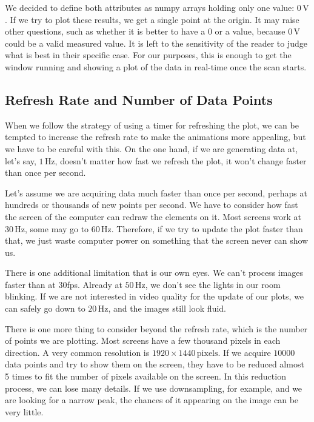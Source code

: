We decided to define both attributes as numpy arrays holding only one value: $0\,\textrm{V}$. If we try to plot these results, we get a single point at the origin. It may raise other questions, such as whether it is better to have a $0$ or a  value, because $0\,\textrm{V}$ could be a valid measured value. It is left to the sensitivity of the reader to judge what is best in their specific case. For our purposes, this is enough to get the window running and showing a plot of the data in real-time once the scan starts.


\subsection{Refresh Rate and Number of Data Points}\label{subsec:refresh-rate-and-number-of-data-points}
When we follow the strategy of using a timer for refreshing the plot, we can be tempted to increase the refresh rate to make the animations more appealing, but we have to be careful with this. On the one hand, if we are generating data at, let's say, $1\,\textrm{Hz}$, doesn't matter how fast we refresh the plot, it won't change faster than once per second.

Let's assume we are acquiring data much faster than once per second, perhaps at hundreds or thousands of new points per second. We have to consider how fast the screen of the computer can redraw the elements on it. Most screens work at $30\,\textrm{Hz}$, some may go to $60\,\textrm{Hz}$. Therefore, if we try to update the plot faster than that, we just waste computer power on something that the screen never can show us.

There is one additional limitation that is our own eyes. We can't process images faster than at 30fps. Already at $50\,\textrm{Hz}$, we don't see the lights in our room blinking. If we are not interested in video quality for the update of our plots, we can safely go down to $20\,\textrm{Hz}$, and the images still look fluid.


There is one more thing to consider beyond the refresh rate, which is the number of points we are plotting. Most screens have a few thousand pixels in each direction. A very common resolution is $1920\times1440\,\textrm{pixels}$. If we acquire $10000$ data points and try to show them on the screen, they have to be reduced almost 5 times to fit the number of pixels available on the screen. In this reduction process, we can lose many details. If we use downsampling, for example, and we are looking for a narrow peak, the chances of it appearing on the image can be very little.

